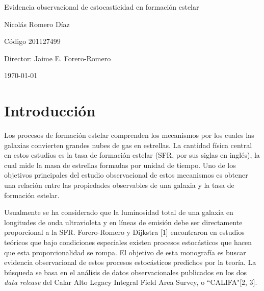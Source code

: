 \documentclass[12pt]{article}
\begin{document}
\begin{center}
\Huge
Evidencia observacional de estocasticidad en formaci\'on estelar

\vspace{3mm}
\Large Nicol\'as Romero D\'iaz

\large
C\'odigo 201127499


\vspace{2mm}
\Large
Director: Jaime E. Forero-Romero

\normalsize
\vspace{2mm}

\today
\end{center}


\normalsize
\section{Introducci\'on}


Los procesos de formaci\'on estelar comprenden los mecanismos por los
cuales las galaxias convierten grandes nubes de gas en estrellas.
La cantidad f\'isica central en estos estudios es la tasa de
formaci\'on estelar (SFR, por sus siglas en ingl\'es), la cual mide
la masa de estrellas formadas por unidad de tiempo.
Uno de los objetivos principales del estudio observacional de estos
mecanismos es obtener una relaci\'on entre las propiedades observables
de una galaxia y la tasa de formaci\'on estelar.


Usualmente se ha considerado que la luminosidad total de una galaxia
en longitudes de onda ultravioleta y en l\'ineas de emisi\'on debe ser
directamente proporcional a la SFR.
Forero-Romero y Dijkstra [1] encontraron en estudios te\'oricos que
bajo condiciones especiales existen procesos estoc\'asticos que hacen
que esta proporcionalidad se rompa.
El objetivo de esta monograf\'ia es buscar evidencia observacional de
estos procesos estoc\'asticos predichos por la teor\'ia.
La b\'usqueda se basa en el an\'alisis de datos observacionales publicados en los dos
\textit{data release} del Calar Alto Legacy Integral Field Area
Survey, o ``CALIFA"[2, 3].
\end{document}
